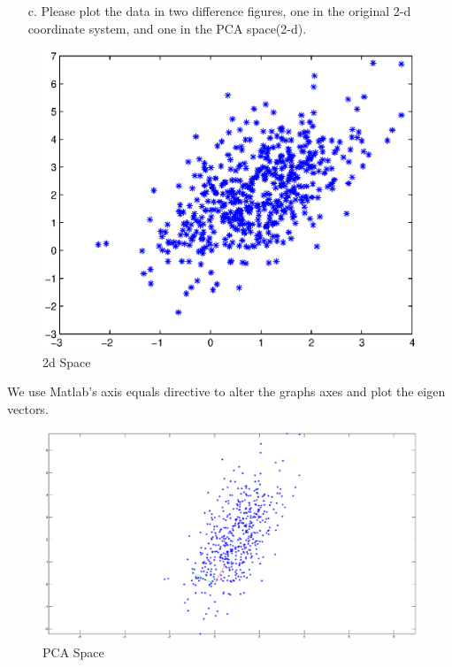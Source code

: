 \documentclass[12pt,letterpaper]{article}
\begin{document}
\begin{enumerate}
\begin{enumerate}
\begin{verbatim}
				 [V, E] = eig(V)
					  V =
					     = -0.8849    0.4657
						0.4657    0.8849
					  E =
					        0.5027         0
					        0    	  2.4730
				\end{verbatim} 
		\item[c.] Please plot the data in two difference figures, one in the original 2-d coordinate system, and one in the PCA space(2-d). \\
	\pagebreak
	\end{enumerate}
	\begin{figure} 
	\includegraphics[width=6in]{original_2d.eps} 
	\caption{2d Space} 
	\end{figure}
	We use Matlab's axis equals directive to alter the graphs axes and plot the eigen vectors.  \\
	\begin{figure} 
	\includegraphics[width=6in]{pca_space.eps} 
	\caption{PCA Space} 
	\end{figure}
	\end{enumerate}
\end{document}
